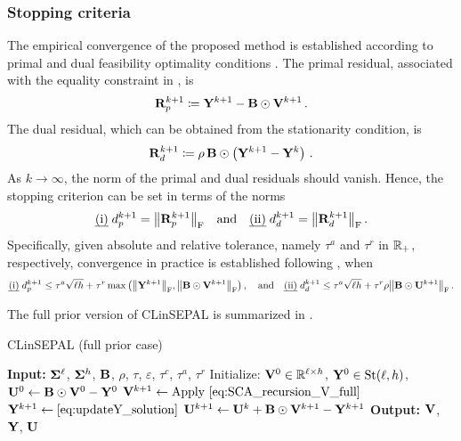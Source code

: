 \subsubsection{Stopping criteria}\label{subsec:stopping_criteria_full}
The empirical convergence of the proposed method is established according to primal and dual feasibility optimality conditions .
The primal residual, associated with the equality constraint in , is
\begin{equation}\label{eq:primal_res_full}
    \mathbf{R}_p^{k+1}\coloneqq\mathbf{Y}^{k+1}-\mathbf{B}\odot\mathbf{V}^{k+1}\,.
\end{equation}
The dual residual, which can be obtained from the stationarity condition, is
\begin{equation}\label{eq:dual_res_full}
    \mathbf{R}_d^{k+1}\coloneqq \rho \,\mathbf{B} \odot\left(\mathbf{Y}^{k+1}-\mathbf{Y}^k\right)\,.
\end{equation}
As $k \rightarrow \infty$, the norm of the primal and dual residuals should vanish.
Hence, the stopping criterion can be set in terms of the norms
\begin{equation}\label{eq:norms_full}
    \text{\emph{(i)}}\;d_p^{k+1}=\norm{\mathbf{R}_p^{k+1}}_{\mathrm{F}} \quad \text{and} \quad \text{\emph{(ii)}}\;d_d^{k+1}=\norm{\mathbf{R}_d^{k+1}}_{\mathrm{F}}\,. 
\end{equation}
Specifically, given absolute and relative tolerance, namely $\tau^a$ and $\tau^r$ in $\mathbb{R}_+$, respectively, convergence in practice is established following , when 
\begin{equation}\label{eq:stopping_criteria_full}
    \text{\emph{(i)}}\; d_p^{k+1} \leq \tau^a\sqrt{\ell h} + \tau^r \max{\left(\frob{\Y^{k+1}}, \frob{\B \odot \V^{k+1}}\right)}\,, \quad
    \text{and} \quad
    \text{\emph{(ii)}}\; d_d^{k+1} \leq \tau^a\sqrt{\ell h} + \tau^r \rho  \frob{\B \odot \scaledU^{k+1}}\,.
\end{equation}

The full prior version of CLinSEPAL is summarized in .

\begin{algorithm}[H]
\caption{CLinSEPAL (full prior case)}
\label{alg:clinsepal_fullprior}
\begin{algorithmic}[1]
\STATE \textbf{Input:} $\boldsymbol{\Sigma}^{\ell}$, $\boldsymbol{\Sigma}^{h}$, $\mathbf{B}$, $\rho$, $\tau$, $\varepsilon$, $\tau^c$, $\tau^a$, $\tau^r$
\STATE Initialize: $\mathbf{V}^0 \in \mathbb{R}^{\ell \times h}$, $\mathbf{Y}^0 \in \mathrm{St}({\ell},{h})$, $\mathbf{U}^0 \gets \mathbf{B}\odot\mathbf{V}^0 - \mathbf{Y}^0$
\REPEAT
    \STATE $\V^{k+1} \gets \text{Apply \cref{eq:SCA_recursion_V_full}}$
    \STATE $\Y^{k+1} \gets \text{\cref{eq:updateY_solution}}$
    \STATE $\mathbf{U}^{k+1} \gets \mathbf{U}^k + \mathbf{B}\odot\mathbf{V}^{k+1} - \mathbf{Y}^{k+1}$
\STATE \textbf{Output:} $\mathbf{V}$, $\mathbf{Y}$, $\mathbf{U}$
\end{algorithmic}
\end{algorithm} 
